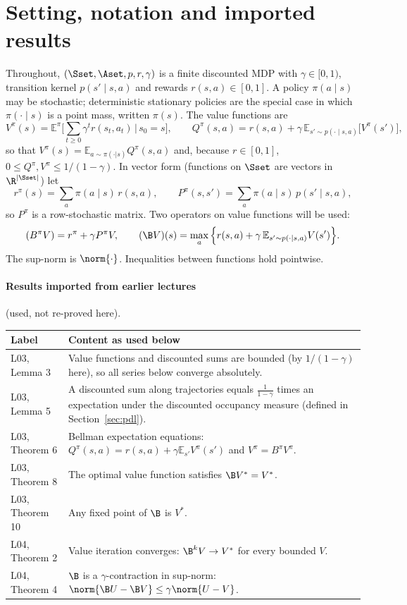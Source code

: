 \documentclass[11pt,a4paper]{article}
\newcommand{\E}{\mathbb{E}}
\theoremstyle{plain}
\theoremstyle{definition}
\theoremstyle{remark}
\begin{document}
\section*{Setting, notation and imported results}

Throughout, $(\Sset,\Aset,p,r,\gamma)$ is a finite discounted MDP with $\gamma\in[0,1)$, transition kernel $p(s'\mid s,a)$ and rewards $r(s,a)\in[0,1]$. A policy $\pi(a\mid s)$ may be stochastic; deterministic stationary policies are the special case in which $\pi(\cdot\mid s)$ is a point mass, written $\pi(s)$. The value functions are
\[
V^\pi(s)=\E^\pi\Big[\sum_{t\ge 0}\gamma^t r(s_t,a_t)\,\Big|\,s_0=s\Big],\qquad
Q^\pi(s,a)=r(s,a)+\gamma\,\E_{s'\sim p(\cdot\mid s,a)}\big[V^\pi(s')\big],
\]
so that $V^\pi(s)=\E_{a\sim\pi(\cdot|s)}Q^\pi(s,a)$ and, because $r\in[0,1]$, $0\le Q^\pi,V^\pi\le 1/(1-\gamma)$. In vector form (functions on $\Sset$ are vectors in $\R^{|\Sset|}$) let
\[
r^\pi(s)=\sum_a\pi(a\mid s)\,r(s,a),\qquad P^\pi(s,s')=\sum_a\pi(a\mid s)\,p(s'\mid s,a),
\]
so $P^\pi$ is a row-stochastic matrix. Two operators on value functions will be used:
\[
(B^\pi V)=r^\pi+\gamma P^\pi V,\qquad (\B V)(s)=\max_a\Big\{r(s,a)+\gamma\,\E_{s'\sim p(\cdot|s,a)}V(s')\Big\}.
\]
The sup-norm is $\norm{\cdot}$. Inequalities between functions hold pointwise.

\paragraph{Results imported from earlier lectures} (used, not re-proved here).
\begin{center}\small
\begin{tabular}{@{}lp{}@{}}
\toprule
\textbf{Label} & \textbf{Content as used below}\\
\midrule
L03, Lemma 3 & Value functions and discounted sums are bounded (by $1/(1-\gamma)$ here), so all series below converge absolutely.\\
L03, Lemma 5 & A discounted sum along trajectories equals $\frac1{1-\gamma}$ times an expectation under the discounted occupancy measure (defined in Section~\ref{sec:pdl}).\\
L03, Theorem 6 & Bellman expectation equations: $Q^\pi(s,a)=r(s,a)+\gamma\E_{s'}V^\pi(s')$ and $V^\pi=B^\pi V^\pi$.\\
L03, Theorem 8 & The optimal value function satisfies $\B V^*=V^*$.\\
L03, Theorem 10 & Any fixed point of $\B$ is $V^*$.\\
L04, Theorem 2 & Value iteration converges: $\B^kV\to V^*$ for every bounded $V$.\\
L04, Theorem 4 & $\B$ is a $\gamma$-contraction in sup-norm: $\norm{\B U-\B V}\le\gamma\norm{U-V}$.\\
\bottomrule
\end{tabular}
\end{center}
\end{document}
